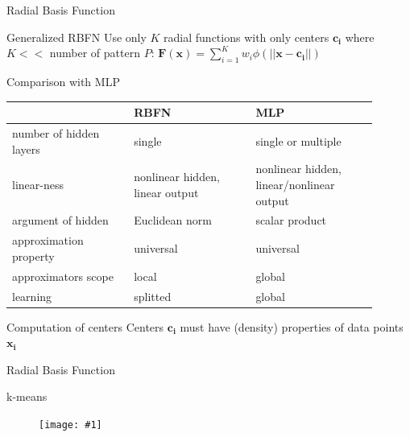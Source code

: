 \documentclass[9pt,t]{beamer}
\newcommand{\picEqHereWidth}[2] { %
    \begin{figure}[htp] 
        \centering
        \texttt{[image: \#1]}
    \end{figure}
}
\begin{document}
\begin{frame}{Radial Basis Function}
    \begin{alertblock}{Generalized RBFN}
        Use only $ K $ radial functions with only centers $ \mathbf{c_i} $ where $ K << $ number of pattern $ P $: $ \mathbf{F(x)} = \sum_{i=1}^{K}w_i\phi(||\mathbf{x}-\mathbf{c_i}||) $
    \end{alertblock}
    \begin{alertblock}{Comparison with MLP}
        \centering
        \begin{tabular}{p{0.3\linewidth} p{0.3\linewidth}p{0.3\linewidth}}
            & RBFN & MLP \\
            \hline
            number of hidden layers & single & single or multiple \\
            linear-ness & nonlinear hidden, linear output & nonlinear hidden, linear/nonlinear output \\
            argument of hidden & Euclidean norm & scalar product \\
            approximation property & universal & universal \\
            approximators scope & local & global \\
            learning & splitted & global
        \end{tabular}
    \end{alertblock}
    \begin{alertblock}{Computation of centers}
        Centers $ \mathbf{c_i} $ must have (density) properties of data points $ \mathbf{x_i} $
    \end{alertblock}
\end{frame}

\begin{frame}{Radial Basis Function}
    \begin{alertblock}{k-means}
        \picEqHereWidth{rbfn_kmeans}{\linewidth}
    \end{alertblock}
\end{frame}
\end{document}
